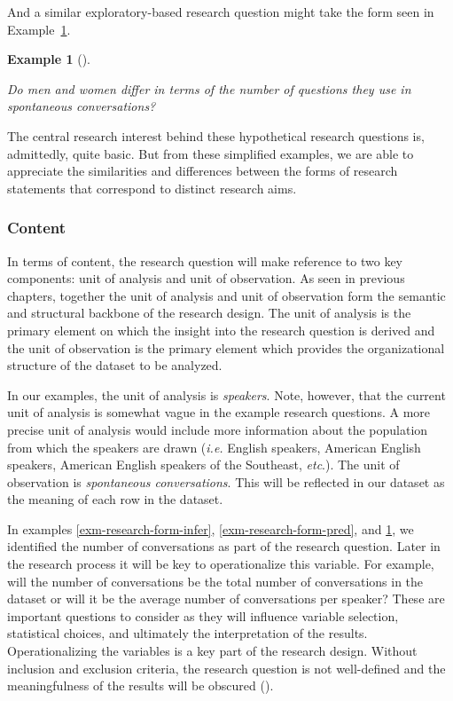 \documentclass[
  letterpaper,
  krantz1]{latex/krantz-mod}
\theoremstyle{definition}
\theoremstyle{definition}
\newtheorem{example}{Example}[chapter]
\theoremstyle{remark}
\begin{document}
And a similar exploratory-based research question might take the form
seen in Example~\ref{exm-research-form-exp}.

\begin{example}[]\protect\hypertarget{exm-research-form-exp}{}\label{exm-research-form-exp}

\emph{Do men and women differ in terms of the number of questions they
use in spontaneous conversations?}

\end{example}

The central research interest behind these hypothetical research
questions is, admittedly, quite basic. But from these simplified
examples, we are able to appreciate the similarities and differences
between the forms of research statements that correspond to distinct
research aims.

\subsubsection{Content}\label{sec-research-question-content}

In terms of content, the research question will
make reference to two key components: unit of analysis and unit of
observation. As seen in previous chapters, together the unit of analysis
and unit of observation form the semantic and structural backbone of the
research design. The unit of analysis is the
primary element on which the insight into the research
question is derived and the unit of observation
is the primary element which provides the organizational structure of
the dataset to be analyzed.

In our examples, the unit of analysis is \emph{speakers}. Note, however,
that the current unit of analysis is somewhat vague in the example
research questions. A more precise unit of analysis would include more
information about the population from which the speakers are drawn
(\emph{i.e.} English speakers, American English speakers, American
English speakers of the Southeast, \emph{etc}.). The unit of observation
is \emph{spontaneous conversations}. This will be reflected in our
dataset as the meaning of each row in the dataset.

In examples \ref{exm-research-form-infer}, \ref{exm-research-form-pred},
and \ref{exm-research-form-exp}, we identified the number of
conversations as part of the research question. Later in the research
process it will be key to operationalize this variable. For example,
will the number of conversations be the total number of conversations in
the dataset or will it be the average number of conversations per
speaker? These are important questions to consider as they will
influence variable selection, statistical choices, and ultimately the
interpretation of the results. Operationalizing
the variables is a key part of the research design. Without inclusion
and exclusion criteria, the research question is not well-defined and
the meaningfulness of the results will be obscured
().
\end{document}
